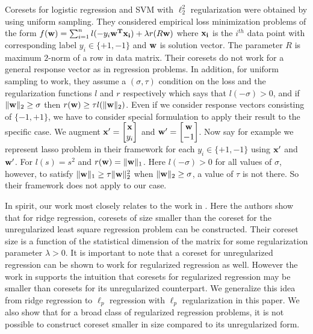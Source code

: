 Coresets for logistic regression and SVM with $\ell_2^2$ regularization were obtained by \cite{curtain2019coresets} using uniform sampling. 
They considered empirical loss minimization problems of the form $f(\mathbf{w})=\sum_{i=1}^n l(-y_i{\mathbf{w^T}\mathbf{x_i})}+ \lambda r(R{\mathbf{w}})$ where $\mathbf{x_i}$ is the $i^{th}$ data point with corresponding label $y_i \in \{+1,-1\}$ and ${\mathbf{w}}$ is solution vector. The parameter $R$ is maximum $2$-norm of a row in data matrix.
Their coresets do not work for a general response vector as in regression problems.
In addition, for uniform sampling to work, they assume a $(\sigma,\tau)$ condition on the loss and the regularization functions $l$ and $r$ respectively which says that $l(-\sigma) > 0$, and if $\|\mathbf{w}\|_2 \geq \sigma$
then $r(\mathbf{w}) \geq \tau l(\|\mathbf{w}\|_2) $. Even if we consider response vectors consisting of $\{-1,+1\}$, we have to consider special formulation to apply their result to the specific case. We augment $\mathbf{x'}= \begin{bmatrix} \mathbf{x}\\ y_i \end{bmatrix}$ and $\mathbf{w'}= \begin{bmatrix} \mathbf{w}\\ -1 \end{bmatrix} $. Now say for example we represent lasso problem in their framework for each $y_i \in \{+1,-1\}$ using $\mathbf{x'}$ and $\mathbf{w'}$. For  $l(s) =s^2$ and $r(\mathbf{w})= \|\mathbf{w}\|_1$. Here $l(-\sigma) > 0$ for all values of $\sigma$, however, to satisfy $\|\mathbf{w}\|_1 \geq \tau\|\mathbf{w}\|_2^2$ when $\|\mathbf{w}\|_2 \geq \sigma$, a value of $\tau$ is not there. So their framework does not apply to our case.

In spirit, our work most closely relates to the work in \cite{avron2017sharper}. Here the authors show that for ridge regression, coresets of size smaller than the coreset for the unregularized least square regression problem can be constructed. Their coreset size is a function of the statistical dimension of the matrix for some regularization parameter $\lambda > 0$. It is important to note that a coreset for unregularized regression can be shown to work for regularized regression as well. However the work in \cite{avron2017sharper} supports the intuition that coresets for regularized regression may be smaller than coresets for its unregularized counterpart. We generalize this idea from ridge regression to $\ell_p$ regression with $\ell_p$ regularization in this paper. We also show that for a broad class of regularized regression problems, it is not possible to construct coreset smaller in size compared to its unregularized form.